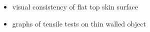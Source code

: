 \begin{itemize}
\item visual consistency of flat top skin surface
\item graphs of tensile tests on thin walled object
\end{itemize}











